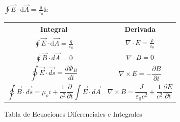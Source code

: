 \documentclass{article}
\begin{document}



	\Blindtext

	$\displaystyle\oint\vec{E}\cdot\text{d}\vec{A}=\frac{q}{\varepsilon_0}$&


	\begin{center}
		
	\begin{tabular}{|c|c|}
	\hline \hline
	Integral&Derivada\\
	\hline \hline

	
	$\displaystyle{\oint\vec{E}\cdot\text{d}\vec{A}=\frac{q}{\varepsilon_0}}$&

	
	$\displaystyle{\nabla\cdot{E}=\frac{\rho}{\varepsilon_0}}$
	 \\

	
	$\displaystyle{\oint\vec{B}\cdot d \vec{A}=0}$
	 &

	
	$\displaystyle{\nabla\cdot{B}=0}$
	\\

	\begin{equation*}
	\oint\vec{E}\cdot  \vec{ds}=\frac{d\Phi_B}{dt}
	\end{equation*} &

	\begin{equation*}
	\nabla\times{E}=-\frac{\partial B}{\partial t}
	\end{equation*} \\

	\begin{equation*}
	\oint\vec{B}\cdot  \vec{ds}=\mu_o i +\frac{1}{c^2} \frac{\partial}{\partial t}\int\vec{E}\cdot d \vec{A}
	\end{equation*} &

	\begin{equation*}
	\nabla\times{B}=\frac{J}{\varepsilon_0 c^2}+\frac{1}{c^2}\frac{\partial E}{\partial t}
	\end{equation*} \\

	\hline \hline
	\end{tabular}
	\center	
	\caption{Tabla de Ecuaciones Diferenciales e Integrales}
	\label{tab:ecuaciones}  
	\end{center}

	\begin{multicols}{4}
	\blindtext
	\end{multicols}
\end{document}
